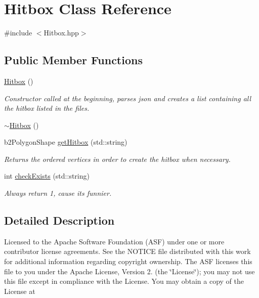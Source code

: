 \hypertarget{class_hitbox}{\section{Hitbox Class Reference}
\label{class_hitbox}
}


{\ttfamily \#include $<$Hitbox.\+hpp$>$}

\subsection*{Public Member Functions}
\begin{DoxyCompactItemize}
\item 
\hyperlink{class_hitbox_a999b0be8486978b3dd7bcd001c7c3c03}{Hitbox} ()
\begin{DoxyCompactList}\small\item\em Constructor called at the beginning, parses json and creates a list containing all the hitbox listed in the files. \end{DoxyCompactList}\item 
\hyperlink{class_hitbox_aafd01dbe871f6f7f464217345bd4ca01}{$\sim$\+Hitbox} ()
\item 
b2\+Polygon\+Shape \hyperlink{class_hitbox_a2f5b5e9940cc0918e58dfbfb62a493bb}{get\+Hitbox} (std\+::string)
\begin{DoxyCompactList}\small\item\em Returns the ordered vertices in order to create the hitbox when necessary. \end{DoxyCompactList}\item 
int \hyperlink{class_hitbox_ae1b89c84071782c72ee6feb56c109c59}{check\+Exists} (std\+::string)
\begin{DoxyCompactList}\small\item\em Always return 1, cause its funnier. \end{DoxyCompactList}\end{DoxyCompactItemize}


\subsection{Detailed Description}
Licensed to the Apache Software Foundation (A\+S\+F) under one or more contributor license agreements. See the N\+O\+T\+I\+C\+E file distributed with this work for additional information regarding copyright ownership. The A\+S\+F licenses this file to you under the Apache License, Version 2. (the \char`\"{}\+License\char`\"{}); you may not use this file except in compliance with the License. You may obtain a copy of the License at

